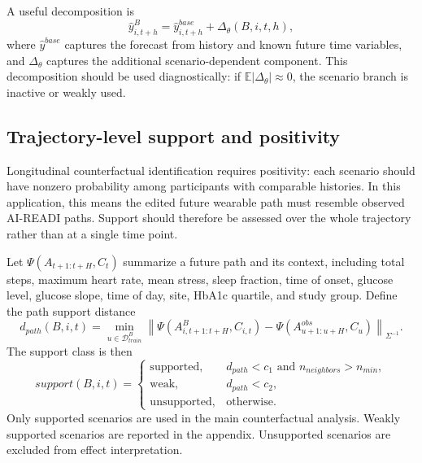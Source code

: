 A useful decomposition is
\begin{equation}
    \hat{y}^{B}_{i,t+h}
    = \hat{y}^{base}_{i,t+h} + \Delta_\theta(B,i,t,h),
    \label{eq:base_delta_decomposition}
\end{equation}
where $\hat{y}^{base}$ captures the forecast from history and known future time variables, and $\Delta_\theta$ captures the additional scenario-dependent component. This decomposition should be used diagnostically: if $\mathbb{E}|\Delta_\theta|\approx 0$, the scenario branch is inactive or weakly used.

\subsection{Trajectory-level support and positivity}
\label{subsec:support_positivity}

Longitudinal counterfactual identification requires positivity: each scenario should have nonzero probability among participants with comparable histories. In this application, this means the edited future wearable path must resemble observed AI-READI paths. Support should therefore be assessed over the whole trajectory rather than at a single time point.

Let $\Psi(A_{t+1:t+H},C_t)$ summarize a future path and its context, including total steps, maximum heart rate, mean stress, sleep fraction, time of onset, glucose level, glucose slope, time of day, site, HbA1c quartile, and study group. Define the path support distance
\begin{equation}
    d_{path}(B,i,t)
    =
    \min_{u\in\mathcal{D}^{B}_{train}}
    \left\|\Psi(A^{B}_{i,t+1:t+H},C_{i,t})
    - \Psi(A^{obs}_{u+1:u+H},C_u)\right\|_{\Sigma^{-1}}.
    \label{eq:path_support}
\end{equation}
The support class is then
\begin{equation}
    support(B,i,t)=
    \begin{cases}
        \mathrm{supported}, & d_{path}<c_1 \text{ and } n_{neighbors}>n_{min},\\
        \mathrm{weak}, & d_{path}<c_2,\\
        \mathrm{unsupported}, & \mathrm{otherwise}.
    \end{cases}
    \label{eq:support_class}
\end{equation}
Only supported scenarios are used in the main counterfactual analysis. Weakly supported scenarios are reported in the appendix. Unsupported scenarios are excluded from effect interpretation.

